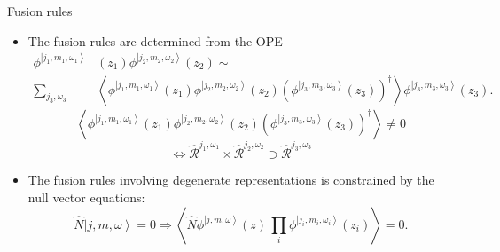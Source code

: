 \documentclass{beamer}
\newcommand{\ket}[1]{\left| #1 \right\rangle}
\newcommand{\vev}[1]{\left\langle #1 \right\rangle}
\begin{document}
\begin{frame}{Fusion rules}
  \begin{itemize}
    \item The fusion rules are determined from the OPE 
          \begin{equation*}
            \begin{aligned}
              \phi^{\ket{j_{1},m_{1},\omega_{1}}} & (z_{1})\phi^{\ket{j_{2},m_{2}, \omega_{2}}}(z_{2}) \sim \\
               \sum_{j_{3},\omega_{3}} 
              &\left\langle  \phi^{\ket{j_{1},m_{1},\omega_{1}}}(z_{1}) \phi^{\ket{j_{2},m_{2}, \omega_{2}}}(z_{2}) \left(\phi^{\ket{j_{3},m_{3},\omega_{3}}}(z_{3}) \right)^{\dagger}\right\rangle \phi^{\ket{j_{3},m_{3},\omega_{3}}}(z_{3}).
            \end{aligned}
          \end{equation*}
          \begin{equation*}
              \vev{\phi^{\ket{j_{1},m_{1},\omega_{1}}}(z_{1}) \phi^{\ket{j_{2},m_{2}, \omega_{2}}}(z_{2}) \left(\phi^{\ket{j_{3},m_{3},\omega_{3}}}(z_{3}) \right)^{\dagger}} 
            \neq 0
          \end{equation*}
          \begin{equation*}
             \Longleftrightarrow \widehat{\mathcal{R}}^{j_{1},\omega_{1}} \times \widehat{\mathcal{R}}^{j_{2},\omega_{2}} \supset \widehat{\mathcal{R}}^{j_{3},\omega_{3}}
          \end{equation*}
    \item The fusion rules involving degenerate representations is constrained by the null vector equations:
          \begin{equation*}
            \hat{N} \ket{j,m,\omega} = 0 \Longrightarrow \vev{\hat{N} \phi^{\ket{j,m,\omega}}(z)\, \prod_{i} \phi^{\ket{j_{i},m_{i},\omega_{i}}} (z_{i} )} = 0.
          \end{equation*}
  \end{itemize}
\end{frame}
\end{document}
